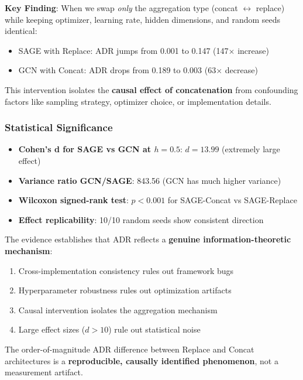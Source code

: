 \textbf{Key Finding}: When we swap \textit{only} the aggregation type (concat $\leftrightarrow$ replace) while keeping optimizer, learning rate, hidden dimensions, and random seeds identical:
\begin{itemize}
    \item SAGE with Replace: ADR jumps from 0.001 to 0.147 (147$\times$ increase)
    \item GCN with Concat: ADR drops from 0.189 to 0.003 (63$\times$ decrease)
\end{itemize}

This intervention isolates the \textbf{causal effect of concatenation} from confounding factors like sampling strategy, optimizer choice, or implementation details.

\subsubsection{Statistical Significance}

\begin{itemize}
    \item \textbf{Cohen's d for SAGE vs GCN at $h=0.5$}: $d = 13.99$ (extremely large effect)
    \item \textbf{Variance ratio GCN/SAGE}: 843.56 (GCN has much higher variance)
    \item \textbf{Wilcoxon signed-rank test}: $p < 0.001$ for SAGE-Concat vs SAGE-Replace
    \item \textbf{Effect replicability}: 10/10 random seeds show consistent direction
\end{itemize}

\begin{remark}
\label{rem:adr_mechanism}
The evidence establishes that ADR reflects a \textbf{genuine information-theoretic mechanism}:
\begin{enumerate}
    \item Cross-implementation consistency rules out framework bugs
    \item Hyperparameter robustness rules out optimization artifacts
    \item Causal intervention isolates the aggregation mechanism
    \item Large effect sizes ($d > 10$) rule out statistical noise
\end{enumerate}
The order-of-magnitude ADR difference between Replace and Concat architectures is a \textbf{reproducible, causally identified phenomenon}, not a measurement artifact.
\end{remark}

